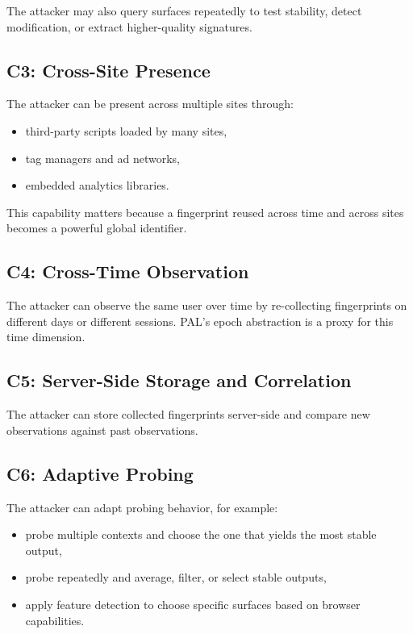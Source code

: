 \documentclass[11pt]{report}
\begin{document}
The attacker may also query surfaces repeatedly to test stability, detect modification, or extract higher-quality signatures.

\subsection{C3: Cross-Site Presence}

The attacker can be present across multiple sites through:

\begin{itemize}
    \item third-party scripts loaded by many sites,
    \item tag managers and ad networks,
    \item embedded analytics libraries.
\end{itemize}

This capability matters because a fingerprint reused across time and across sites becomes a powerful global identifier.

\subsection{C4: Cross-Time Observation}

The attacker can observe the same user over time by re-collecting fingerprints on different days or different sessions. PAL’s epoch abstraction is a proxy for this time dimension.

\subsection{C5: Server-Side Storage and Correlation}

The attacker can store collected fingerprints server-side and compare new observations against past observations.

\subsection{C6: Adaptive Probing}

The attacker can adapt probing behavior, for example:

\begin{itemize}
    \item probe multiple contexts and choose the one that yields the most stable output,
    \item probe repeatedly and average, filter, or select stable outputs,
    \item apply feature detection to choose specific surfaces based on browser capabilities.
\end{itemize}
\end{document}
